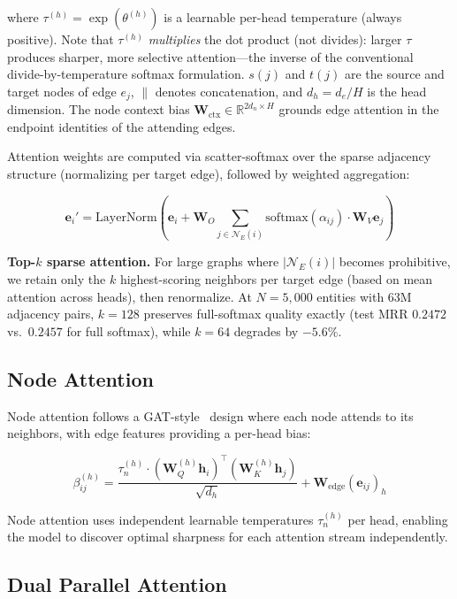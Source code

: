 \documentclass{article}
\begin{document}
where $\tau^{(h)} = \exp(\theta^{(h)})$ is a learnable per-head temperature (always positive). Note that $\tau^{(h)}$ \emph{multiplies} the dot product (not divides): larger $\tau$ produces sharper, more selective attention---the inverse of the conventional divide-by-temperature softmax formulation. $s(j)$ and $t(j)$ are the source and target nodes of edge $e_j$, $\|$ denotes concatenation, and $d_h = d_e / H$ is the head dimension. The node context bias $\mathbf{W}_{\text{ctx}} \in \mathbb{R}^{2d_n \times H}$ grounds edge attention in the endpoint identities of the attending edges.

Attention weights are computed via scatter-softmax over the sparse adjacency structure (normalizing per target edge), followed by weighted aggregation:

\begin{equation}
    \mathbf{e}_i' = \text{LayerNorm}\left(\mathbf{e}_i + \mathbf{W}_O \sum_{j \in \mathcal{N}_E(i)} \text{softmax}(\alpha_{ij}) \cdot \mathbf{W}_V \mathbf{e}_j\right)
\end{equation}

\textbf{Top-$k$ sparse attention.} For large graphs where $|\mathcal{N}_E(i)|$ becomes prohibitive, we retain only the $k$ highest-scoring neighbors per target edge (based on mean attention across heads), then renormalize. At $N{=}5{,}000$ entities with 63M adjacency pairs, $k{=}128$ preserves full-softmax quality exactly (test MRR $0.2472$ vs.\ $0.2457$ for full softmax), while $k{=}64$ degrades by $-5.6\%$.

\subsection{Node Attention}
\label{sec:node_attn}

Node attention follows a GAT-style~\cite{velickovic2018graph} design where each node attends to its neighbors, with edge features providing a per-head bias:

\begin{equation}
    \beta_{ij}^{(h)} = \frac{\tau_n^{(h)} \cdot (\mathbf{W}_Q^{(h)} \mathbf{h}_i)^\top (\mathbf{W}_K^{(h)} \mathbf{h}_j)}{\sqrt{d_h}} + \mathbf{W}_{\text{edge}}(\mathbf{e}_{ij})_h
\end{equation}

Node attention uses independent learnable temperatures $\tau_n^{(h)}$ per head, enabling the model to discover optimal sharpness for each attention stream independently.

\subsection{Dual Parallel Attention}
\label{sec:dual_attn}
\end{document}
